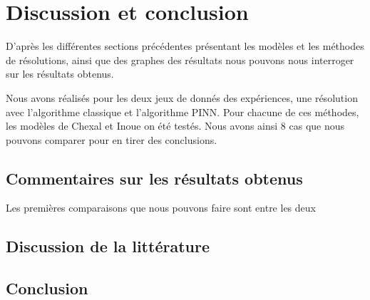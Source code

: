 \section{Discussion et conclusion}
D'après les différentes sections précédentes présentant les modèles et les méthodes de résolutions, ainsi que des graphes des résultats nous pouvons nous interroger sur les résultats obtenus.\\ \par
Nous avons réalisés pour les deux jeux de donnés des expériences, une résolution avec l'algorithme classique et l'algorithme PINN. Pour chacune de ces méthodes, les modèles de Chexal et Inoue on été testés. Nous avons ainsi 8 cas que nous pouvons comparer pour en tirer des conclusions.
\subsection{Commentaires sur les résultats obtenus}
Les premières comparaisons que nous pouvons faire sont entre les deux 
\subsection{Discussion  de la littérature}

\subsection{Conclusion}

